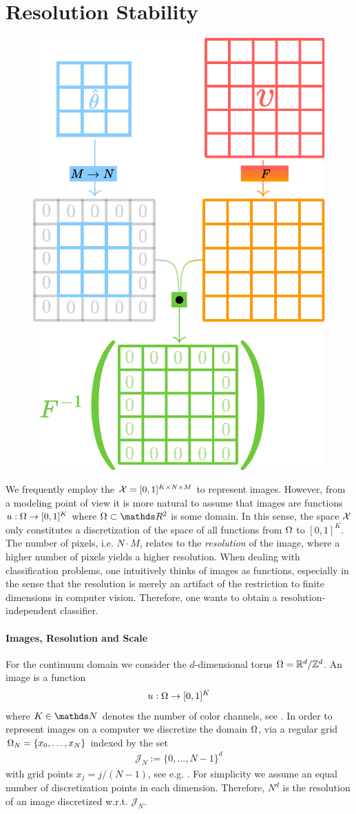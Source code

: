 \section{Resolution Stability}\label{sec:FNO}
%
\setlength\intextsep{0pt}
\begin{figure}
\centering
\includegraphics[width=.4\textwidth]{atelier/FNO/trigo.pdf}
\end{figure}
%
We frequently employ the $\mathcal{X}=[0,1]^{K\times N\times M}$ to represent images. However, from a modeling point of view it is more natural to assume that images are functions $u:\Omega\to[0,1]^K$ where $\domain\subset\R^2$ is some domain. In this sense, the space $\mathcal{X}$ only constitutes a discretization of the space of all functions from $\Omega$ to $[0,1]^K$. The number of pixels, i.e. $N\cdot M$, relates to the \emph{resolution} of the image, where a higher number of pixels yields a higher resolution. When dealing with classification problems, one intuitively thinks of images as functions, especially in the sense that the resolution is merely an artifact of the restriction to finite dimensions in computer vision. Therefore, one wants to obtain a resolution-independent classifier.
%
\paragraph{Images, Resolution and Scale}
%
%
For the continuum domain we consider the $d$-dimensional torus $\Omega = \mathbb{R}^d / \mathbb{Z}^d$. An image is a function 
%
\begin{align*}
u:\Omega\to[0,1]^K
\end{align*}
%
where $K\in\N$ denotes the number of color channels, see \cite{gonzales1987digital}. In order to represent images on a computer we discretize the domain $\Omega$, via a regular grid $\Omega_N = \{x_0,\ldots,x_N\}$ indexed by the set
%
\begin{align*}
\mathcal{J}_N := \{0,\ldots, N-1\}^d
\end{align*}
%
with grid points $x_j = j/(N-1)$, see e.g. \cite{kabri2022FNO, kovachki2021universal}. For simplicity we assume an equal number of discretization points in each dimension. Therefore, $N^d$ is the resolution of an image discretized w.r.t. $\mathcal{J}_N$. 


